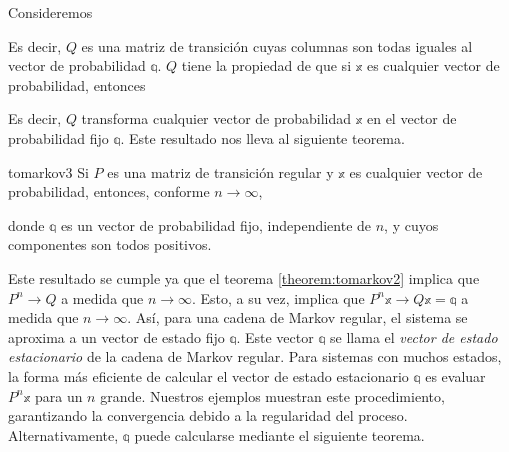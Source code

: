 Consideremos
\begin{matrizn}
\end{matrizn}
Es decir, $Q$ es una matriz de transición cuyas columnas son todas iguales al vector de probabilidad $\mathbb{q}$. $Q$ tiene la propiedad de que si $\mathbb{x}$ es cualquier vector de probabilidad, entonces
\begin{nscenter}
\end{nscenter}
Es decir, $Q$ transforma cualquier vector de probabilidad $\mathbb{x}$ en el vector de probabilidad fijo $\mathbb{q}$. Este resultado nos lleva al siguiente teorema.

\begin{theorem}{}{tomarkov3}
    Si $P$ es una matriz de transición regular y $\mathbb{x}$ es cualquier vector de probabilidad, entonces, conforme $n \to \infty$, 
    \begin{nscenter}
    \end{nscenter}
    donde $\mathbb{q}$ es un vector de probabilidad fijo, independiente de $n$, y cuyos componentes son todos positivos.
\end{theorem}

Este resultado se cumple ya que el teorema \ref{theorem:tomarkov2} implica que $P^n \to Q$ a medida que $n \to \infty$. Esto, a su vez, implica que $P^n\mathbb{x} \to Q\mathbb{x} = \mathbb{q}$ a medida que $n \to \infty$. Así, para una cadena de Markov regular, el sistema se aproxima a un vector de estado fijo $\mathbb{q}$. Este vector $\mathbb{q}$ se llama el \emph{vector de estado estacionario} de la cadena de Markov regular. Para sistemas con muchos estados, la forma más eficiente de calcular el vector de estado estacionario $\mathbb{q}$ es evaluar $P^n \mathbb{x}$ para un $n$ grande. Nuestros ejemplos muestran este procedimiento, garantizando la convergencia debido a la regularidad del proceso. Alternativamente, $\mathbb{q}$ puede calcularse mediante el siguiente teorema.


